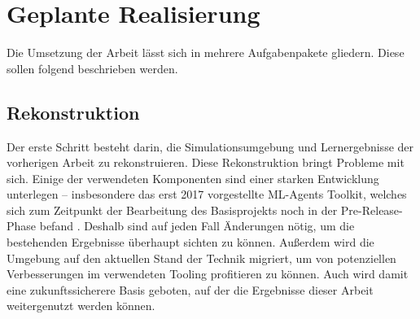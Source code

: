 
\section{Geplante Realisierung}
Die Umsetzung der Arbeit lässt sich in mehrere Aufgabenpakete gliedern.
Diese sollen folgend beschrieben werden.

\subsection{Rekonstruktion}
Der erste Schritt besteht darin, die Simulationsumgebung und Lernergebnisse der vorherigen Arbeit zu rekonstruieren.
Diese Rekonstruktion bringt Probleme mit sich.
Einige der verwendeten Komponenten sind einer starken Entwicklung unterlegen -- insbesondere das erst 2017 vorgestellte ML-Agents Toolkit, welches sich zum Zeitpunkt der Bearbeitung des Basisprojekts noch in der Pre-Release-Phase befand \cite{mlagentsHistory}.
Deshalb sind auf jeden Fall Änderungen nötig, um die bestehenden Ergebnisse überhaupt sichten zu können.
Außerdem wird die Umgebung auf den aktuellen Stand der Technik migriert, um von potenziellen Verbesserungen im verwendeten Tooling profitieren zu können.
Auch wird damit eine zukunftssicherere Basis geboten, auf der die Ergebnisse dieser Arbeit weitergenutzt werden können.

